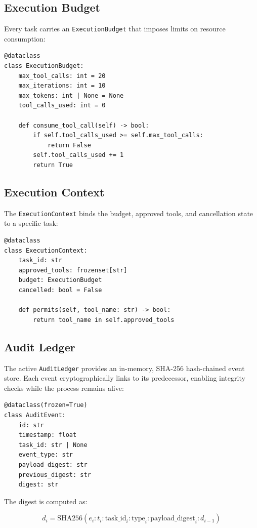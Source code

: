 \documentclass[11pt]{article}
\begin{document}
\subsection{Execution Budget}

Every task carries an \texttt{ExecutionBudget} that imposes limits on resource consumption:

\begin{lstlisting}
@dataclass
class ExecutionBudget:
    max_tool_calls: int = 20
    max_iterations: int = 10
    max_tokens: int | None = None
    tool_calls_used: int = 0

    def consume_tool_call(self) -> bool:
        if self.tool_calls_used >= self.max_tool_calls:
            return False
        self.tool_calls_used += 1
        return True
\end{lstlisting}

\subsection{Execution Context}

The \texttt{ExecutionContext} binds the budget, approved tools, and cancellation state to a specific task:

\begin{lstlisting}
@dataclass
class ExecutionContext:
    task_id: str
    approved_tools: frozenset[str]
    budget: ExecutionBudget
    cancelled: bool = False

    def permits(self, tool_name: str) -> bool:
        return tool_name in self.approved_tools
\end{lstlisting}

\subsection{Audit Ledger}

The active \texttt{AuditLedger} provides an in-memory, SHA-256 hash-chained event store.
Each event cryptographically links to its predecessor, enabling integrity checks while
the process remains alive:

\begin{lstlisting}
@dataclass(frozen=True)
class AuditEvent:
    id: str
    timestamp: float
    task_id: str | None
    event_type: str
    payload_digest: str
    previous_digest: str
    digest: str
\end{lstlisting}

The digest is computed as:

\begin{equation}
  d_i = \mathrm{SHA256}(e_i : t_i : \mathrm{task\_id}_i : \mathrm{type}_i : \mathrm{payload\_digest}_i : d_{i-1})
\end{equation}
\end{document}
